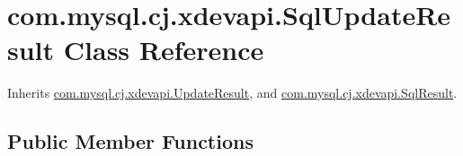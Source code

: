\hypertarget{classcom_1_1mysql_1_1cj_1_1xdevapi_1_1_sql_update_result}{}\section{com.\+mysql.\+cj.\+xdevapi.\+Sql\+Update\+Result Class Reference}
\label{classcom_1_1mysql_1_1cj_1_1xdevapi_1_1_sql_update_result}


Inherits \mbox{\hyperlink{classcom_1_1mysql_1_1cj_1_1xdevapi_1_1_update_result}{com.\+mysql.\+cj.\+xdevapi.\+Update\+Result}}, and \mbox{\hyperlink{interfacecom_1_1mysql_1_1cj_1_1xdevapi_1_1_sql_result}{com.\+mysql.\+cj.\+xdevapi.\+Sql\+Result}}.

\subsection*{Public Member Functions}
